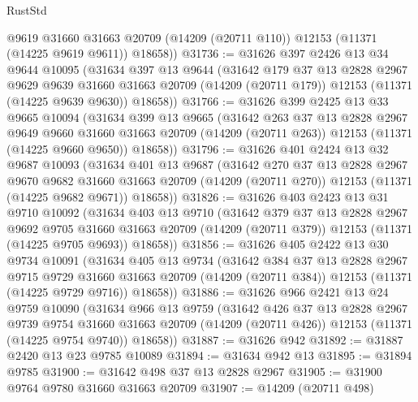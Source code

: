 \begin{lexlean}{RustStd}
\begin{coremodule}
        @9619
        @31660
        @31663
        @20709
        (@14209 (@20711 @110))
        @12153
        (@11371 (@14225 @9619 @9611))
        @18658))
@31736 := @31626
    @397
    @2426
    @13
    @34
    @9644
    @10095
    (@31634
      @397
      @13
      @9644
      (@31642
        @179
        @37
        @13
        @2828
        @2967
        @9629
        @9639
        @31660
        @31663
        @20709
        (@14209 (@20711 @179))
        @12153
        (@11371 (@14225 @9639 @9630))
        @18658))
@31766 := @31626
    @399
    @2425
    @13
    @33
    @9665
    @10094
    (@31634
      @399
      @13
      @9665
      (@31642
        @263
        @37
        @13
        @2828
        @2967
        @9649
        @9660
        @31660
        @31663
        @20709
        (@14209 (@20711 @263))
        @12153
        (@11371 (@14225 @9660 @9650))
        @18658))
@31796 := @31626
    @401
    @2424
    @13
    @32
    @9687
    @10093
    (@31634
      @401
      @13
      @9687
      (@31642
        @270
        @37
        @13
        @2828
        @2967
        @9670
        @9682
        @31660
        @31663
        @20709
        (@14209 (@20711 @270))
        @12153
        (@11371 (@14225 @9682 @9671))
        @18658))
@31826 := @31626
    @403
    @2423
    @13
    @31
    @9710
    @10092
    (@31634
      @403
      @13
      @9710
      (@31642
        @379
        @37
        @13
        @2828
        @2967
        @9692
        @9705
        @31660
        @31663
        @20709
        (@14209 (@20711 @379))
        @12153
        (@11371 (@14225 @9705 @9693))
        @18658))
@31856 := @31626
    @405
    @2422
    @13
    @30
    @9734
    @10091
    (@31634
      @405
      @13
      @9734
      (@31642
        @384
        @37
        @13
        @2828
        @2967
        @9715
        @9729
        @31660
        @31663
        @20709
        (@14209 (@20711 @384))
        @12153
        (@11371 (@14225 @9729 @9716))
        @18658))
@31886 := @31626
    @966
    @2421
    @13
    @24
    @9759
    @10090
    (@31634
      @966
      @13
      @9759
      (@31642
        @426
        @37
        @13
        @2828
        @2967
        @9739
        @9754
        @31660
        @31663
        @20709
        (@14209 (@20711 @426))
        @12153
        (@11371 (@14225 @9754 @9740))
        @18658))
@31887 := @31626 @942
@31892 := @31887 @2420 @13 @23 @9785 @10089
@31894 := @31634 @942 @13
@31895 := @31894 @9785
@31900 := @31642 @498 @37 @13 @2828 @2967
@31905 := @31900 @9764 @9780 @31660 @31663 @20709
@31907 := @14209 (@20711 @498)

\end{coremodule}
\end{lexlean}
